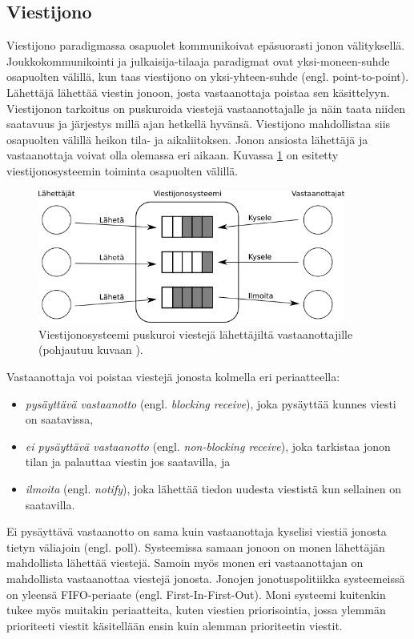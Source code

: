 \subsection{Viestijono}
Viestijono paradigmassa osapuolet kommunikoivat epäsuorasti jonon välityksellä. Joukkokommunikointi ja julkaisija-tilaaja paradigmat ovat yksi-moneen-suhde osapuolten välillä, kun taas viestijono on yksi-yhteen-suhde (engl. point-to-point). Lähettäjä lähettää viestin jonoon, josta vastaanottaja poistaa sen käsittelyyn. Viestijonon tarkoitus on puskuroida viestejä vastaanottajalle ja näin taata niiden saatavuus ja järjestys millä ajan hetkellä hyvänsä. Viestijono mahdollistaa siis osapuolten välillä heikon tila- ja aikaliitoksen. Jonon ansiosta lähettäjä ja vastaanottaja voivat olla olemassa eri aikaan. Kuvassa \ref{fig:message-queue-communication} on esitetty viestijonosysteemin toiminta osapuolten välillä.

\begin{figure}[ht!]
	\includegraphics[width=0.9\textwidth]{pictures/message-queue.png}
	\caption{Viestijonosysteemi puskuroi viestejä lähettäjiltä vastaanottajille (pohjautuu kuvaan \mbox{\cite[s.~255]{distributed-systems-concepts-and-design}}).}
	\label{fig:message-queue-communication}
\end{figure}

Vastaanottaja voi poistaa viestejä jonosta kolmella eri periaatteella:
\begin{itemize}
	\item \emph{pysäyttävä vastaanotto} (engl. \emph{blocking receive}), joka pysäyttää kunnes viesti on saatavissa,
	\item \emph{ei pysäyttävä vastaanotto} (engl. \emph{non-blocking receive}), joka tarkistaa jonon tilan ja palauttaa viestin jos saatavilla, ja
	\item \emph{ilmoita} (engl. \emph{notify}), joka lähettää tiedon uudesta viestistä kun sellainen on saatavilla.
\end{itemize}
Ei pysäyttävä vastaanotto on sama kuin vastaanottaja kyselisi viestiä jonosta tietyn väliajoin (engl. poll). Systeemissa samaan jonoon on monen lähettäjän mahdollista lähettää viestejä. Samoin myös monen eri vastaanottajan on mahdollista vastaanottaa viestejä jonosta. Jonojen jonotuspolitiikka systeemeissä on yleensä FIFO-periaate (engl. First-In-First-Out). Moni systeemi kuitenkin tukee myös muitakin periaatteita, kuten viestien priorisointia, jossa ylemmän prioriteeti viestit käsitellään ensin kuin alemman prioriteetin viestit.

